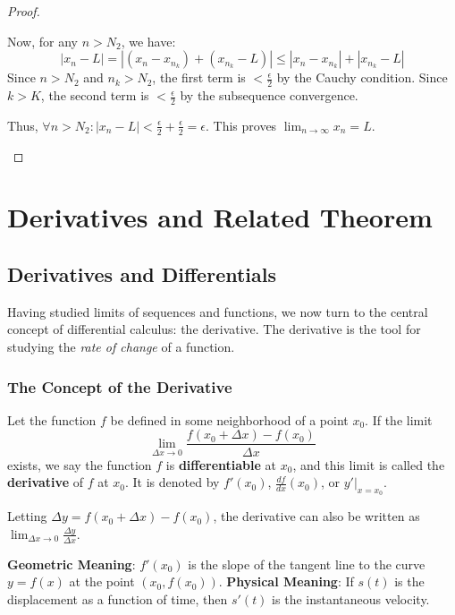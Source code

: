 \documentclass[oneside]{book}
\begin{document}
\begin{proof}
\begin{enumerate}
    Now, for any $n > N_2$, we have:
    \[
    |x_n - L| = |(x_n - x_{n_k}) + (x_{n_k} - L)| \leq |x_n - x_{n_k}| + |x_{n_k} - L|
    \]
    Since $n > N_2$ and $n_k > N_2$, the first term is $< \frac{\epsilon}{2}$ by the Cauchy condition.
    Since $k > K$, the second term is $< \frac{\epsilon}{2}$ by the subsequence convergence.
    
    Thus, $\forall n > N_2: |x_n - L| < \frac{\epsilon}{2} + \frac{\epsilon}{2} = \epsilon$.
    This proves $\lim_{n \to \infty} x_n = L$.
\end{enumerate}
\end{proof}

\newpage

\section{Derivatives and Related Theorem}

\subsection{Derivatives and Differentials}

Having studied limits of sequences and functions, we now turn to the central concept of differential calculus: the derivative. The derivative is the tool for studying the \textit{rate of change} of a function.

\subsubsection{The Concept of the Derivative}

\begin{definition}[Derivative]
Let the function $f$ be defined in some neighborhood of a point $x_0$. If the limit
\[
\lim_{\Delta x \to 0} \frac{f(x_0 + \Delta x) - f(x_0)}{\Delta x}
\]
exists, we say the function $f$ is \textbf{differentiable} at $x_0$, and this limit is called the \textbf{derivative} of $f$ at $x_0$.
It is denoted by $f'(x_0)$, $\frac{df}{dx}(x_0)$, or $y'|_{x=x_0}$.

Letting $\Delta y = f(x_0 + \Delta x) - f(x_0)$, the derivative can also be written as $\lim_{\Delta x \to 0} \frac{\Delta y}{\Delta x}$.
\end{definition}



\textbf{Geometric Meaning}: $f'(x_0)$ is the slope of the tangent line to the curve $y=f(x)$ at the point $(x_0, f(x_0))$.
\textbf{Physical Meaning}: If $s(t)$ is the displacement as a function of time, then $s'(t)$ is the instantaneous velocity.
\end{document}
